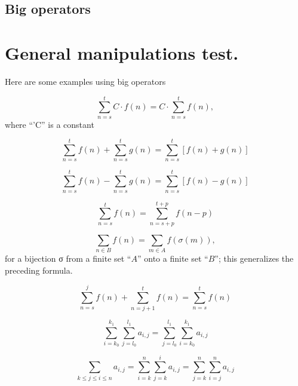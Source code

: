  \subsection{Big operators}
 \begin{multicols}{2}
 \showop{}
 \showop{}
 \showop{}
 \showop{}
 \showop{}
 \showop{}
 \showop{}
 \showop{}
 \showop{}
 \showop{}
 \showop{}
 \showop{}
 \showop{}
 \showop{}
 \showop{}
 \showop{}
 \showop{}
 \showop{}
 \showop{}
 \showop{}
 \showop{}
 \showop{}
 \showop{}
 \showop{}
 \showop{}
 \showop{}
 \showop{}
 \showop{}
 \showop{}
 \showop{}
 \showop{}
 \showop{}
 \showop{}
 \end{multicols}
 
 \section{General manipulations test.}
 
 Here are some examples using big operators

$$\sum_{n=s}^t C\cdot f(n) = C\cdot \sum_{n=s}^t f(n),$$ where ``'C'' is a constant

\[\sum_{n=s}^t f(n) + \sum_{n=s}^{t} g(n) = \sum_{n=s}^t \left[f(n) + g(n)\right]\] 

\[\sum_{n=s}^t f(n) - \sum_{n=s}^{t} g(n) = \sum_{n=s}^t \left[f(n) - g(n)\right]\] 

\[\sum_{n=s}^t f(n) = \sum_{n=s+p}^{t+p} f(n-p) \] 

\[\sum_{n\in B} f(n) = \sum_{m\in A} f(\sigma(m)),\] for a bijection σ from a finite set ``$A$'' onto a finite set ``$B$''; this generalizes the preceding formula.

\[\sum_{n=s}^j f(n) + \sum_{n=j+1}^t f(n) = \sum_{n=s}^t f(n)\] 

\[\sum_{i=k_0}^{k_1}\sum_{j=l_0}^{l_1} a_{i,j} = \sum_{j=l_0}^{l_1}\sum_{i=k_0}^{k_1} a_{i,j}\] 

\[\sum_{k\le j \le i\le n} a_{i,j} = \sum_{i=k}^n\sum_{j=k}^i a_{i,j} = \sum_{j=k}^n\sum_{i=j}^n a_{i,j}\] 


